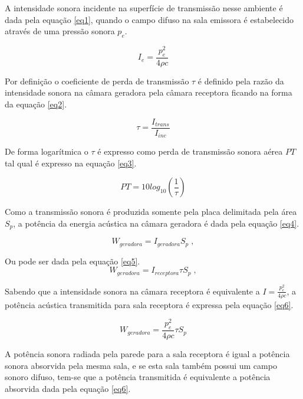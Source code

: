 A intensidade sonora incidente na superfície de transmissão nesse ambiente é dada pela equação \ref{eq1}, quando o campo difuso na sala emissora é estabelecido através de uma pressão sonora $p_{e}$.

\begin{equation}
	I_{e}=\frac{p_{e}^{2}}{4\rho c}
	\label{eq1}
\end{equation}

Por definição o coeficiente de perda de transmissão $\tau$ é definido pela razão da intensidade sonora na câmara geradora pela câmara receptora ficando na forma da equação \ref{eq2}.

\begin{equation}
	\tau=\frac{I_{trans}}{I_{inc}}
	\label{eq2}
\end{equation}

De forma logarítmica o $\tau$ é expresso como perda de transmissão sonora aérea $PT$ tal qual é expresso na equação \ref{eq3}.

\begin{equation}
	PT = 10 log_{10}\left(\frac{1}{\tau}\right)
	\label{eq3}
\end{equation}

Como a transmissão sonora é produzida somente pela placa delimitada pela área $S_p$, a potência da energia acústica na câmara geradora é dada pela equação \ref{eq4}.

\begin{equation}
	W_{geradora} = I_{geradora}S_{p}\;,
	\label{eq4}	
\end{equation}

Ou pode ser dada pela equação \ref{eq5}.
\begin{equation}
	W_{geradora} = I_{receptora}\tau S_{p}\;,
	\label{eq5}	
\end{equation}

Sabendo que a intensidade sonora na câmara receptora é equivalente a $ I=\frac{p_{e}^{2}}{4\rho c} $, a potência acústica transmitida para sala receptora é expressa pela equação \ref{eq6}.

\begin{equation}
	W_{geradora}=\frac{p_{e}^{2}}{4\rho c}\tau S_{p}
	\label{eq6}
\end{equation}

A potência sonora radiada pela parede para a sala receptora é igual a potência sonora absorvida pela mesma sala, e se esta sala também possui um campo sonoro difuso, tem-se que a potência transmitida é equivalente a potência absorvida dada pela equação \ref{eq6}.

